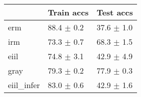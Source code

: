 \begin{tabular}{lll}
\toprule
{} &      Train accs &       Test accs \\
\midrule
erm        &  88.4 $\pm$ 0.2 &  37.6 $\pm$ 1.0 \\
irm        &  73.3 $\pm$ 0.7 &  68.3 $\pm$ 1.5 \\
eiil       &  74.8 $\pm$ 3.1 &  42.9 $\pm$ 4.9 \\
gray       &  79.3 $\pm$ 0.2 &  77.9 $\pm$ 0.3 \\
eiil_infer &  83.0 $\pm$ 0.6 &  42.9 $\pm$ 1.6 \\
\bottomrule
\end{tabular}

